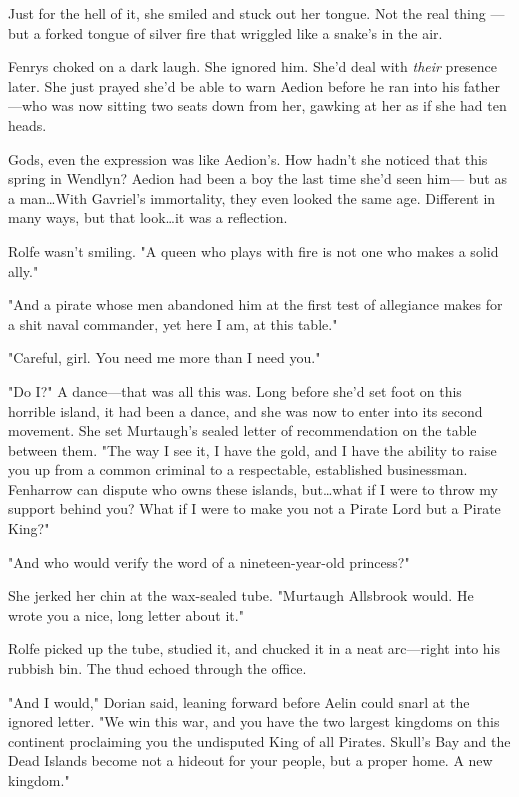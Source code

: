Just for the hell of it, she smiled and stuck out her tongue.
Not the real thing ---but a forked tongue of silver fire that wriggled like a snake's in the air.

Fenrys choked on a dark laugh.
She ignored him.
She'd deal with \emph{their} presence later.
She just prayed she'd be able to warn Aedion before he ran into his father---who was now sitting two seats down from her, gawking at her as if she had ten heads.

Gods, even the expression was like Aedion's.
How hadn't she noticed that this spring in Wendlyn?
Aedion had been a boy the last time she'd seen him--- but as a man\ldots With Gavriel's immortality, they even looked the same age.
Different in many ways, but that look\ldots it was a reflection.

Rolfe wasn't smiling.
"A queen who plays with fire is not one who makes a solid ally."

"And a pirate whose men abandoned him at the first test of allegiance makes for a shit naval commander, yet here I am, at this table."

"Careful, girl.
You need me more than I need you."

"Do I?"
A dance---that was all this was.
Long before she'd set foot on this horrible island, it had been a dance, and she was now to enter into its second movement.
She set Murtaugh's sealed letter of recommendation on the table between them.
"The way I see it, I have the gold, and I have the ability to raise you up from a common criminal to a respectable, established businessman.
Fenharrow can dispute who owns these islands, but\ldots what if I were to throw my support behind you?
What if I were to make you not a Pirate Lord but a Pirate King?"

"And who would verify the word of a nineteen-year-old princess?"

She jerked her chin at the wax-sealed tube.
"Murtaugh Allsbrook would.
He wrote you a nice, long letter about it."

Rolfe picked up the tube, studied it, and chucked it in a neat arc---right into his rubbish bin.
The thud echoed through the office.

"And I would," Dorian said, leaning forward before Aelin could snarl at the ignored letter.
"We win this war, and you have the two largest kingdoms on this continent proclaiming you the undisputed King of all Pirates.
Skull's Bay and the Dead Islands become not a hideout for your people, but a proper home.
A new kingdom."

